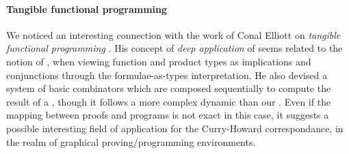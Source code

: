 \begin{scope}

\paragraph{Tangible functional programming}

We noticed an interesting connection with the work of Conal Elliott on
\emph{tangible functional programming} . His concept
of \emph{deep application} of  seems related to the notion
of , when viewing function and product types as
implications and conjunctions through the formulae-as-types interpretation. He
also devised a system of basic combinators which are composed sequentially to
compute the result of a , though it follows a more complex dynamic than
our . Even if the mapping between proofs and programs is not
exact in this case, it suggests a possible interesting field of application for
the Curry-Howard correspondance, in the realm of graphical proving/programming
environments.

\end{scope}